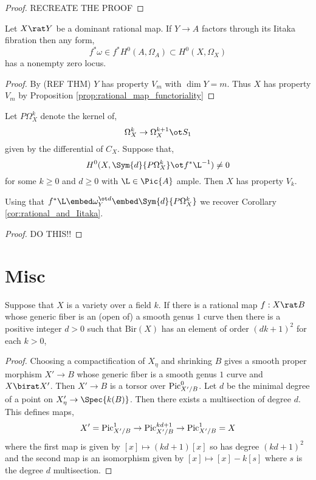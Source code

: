 \documentclass[12pt]{article}
\begin{document}
\begin{proof}
RECREATE THE PROOF
\end{proof}

\begin{cor} \cite{cor:rational_and_Iitaka}
Let $X \rat Y$ be a dominant rational map. If $Y \to A$ factors through its Iitaka fibration then any form,
\[ f^* \omega \in f^* H^0(A, \Omega_A) \subset H^0(X, \Omega_X) \]
has a nonempty zero locus.  
\end{cor}

\begin{proof}
By (REF THM) $Y$ has property $V_m$ with $\dim{Y} = m$. Thus $X$ has property $V_m$ by Proposition \ref{prop:rational_map_functoriality}
\end{proof}

\begin{theorem}
Let $P \Omega^k_X$ denote the kernel of,
\[ \Omega^k_X \to \Omega^{k+1}_X \ot S_1 \]
given by the differential of $C_X$. Suppose that,
\[ H^0(X, \Sym{d}{P \Omega^k_X} \ot f^* \L^{-1}) \neq 0 \]
for some $k \ge 0$ and $d \ge 0$ with $\L \in \Pic{A}$ ample. Then $X$ has property $V_k$. 
\end{theorem}

\begin{rmk}
Using that $f^* \L \embed \omega_Y^{\ot d} \embed \Sym{d}{P \Omega^k_X}$ we recover Corollary \ref{cor:rational_and_Iitaka}. 
\end{rmk}

\begin{proof}
DO THIS!!
\end{proof}

\section{Misc}

\newcommand{\Bir}{\mathrm{Bir}}

\begin{lemma}
Suppose that $X$ is a variety over a field $k$. If there is a rational map $f : X \rat B$ whose generic fiber is an (open of) a smooth genus $1$ curve then there is a positive integer $d > 0$ such that $\Bir(X)$ has an element of order $(d k + 1)^2$ for each $k > 0$,
\end{lemma}

\begin{proof}
Choosing a compactification of $X_\eta$ and shrinking $B$ gives a smooth proper morphism $X' \to B$ whose generic fiber is a smooth genus $1$ curve and $X \birat X'$. Then $X' \to B$ is a torsor over $\mathrm{Pic}^0_{X'/B}$. Let $d$ be the minimal degree of a point on $X'_{\eta} \to \Spec{k(B)}$. Then there exists a multisection of degree $d$. This defines maps,
 \[ X' = \mathrm{Pic}^{1}_{X'/B} \to \mathrm{Pic}^{kd + 1}_{X'/B} \to \mathrm{Pic}^{1}_{X'/B} = X \]
 where the first map is given by $[x] \mapsto (kd + 1) [x]$ so has degree $(kd+1)^2$ and the second map is an isomorphism given by $[x] \mapsto [x] - k [s]$ where $s$ is the degree $d$ multisection. 
\end{proof}
\end{document}
